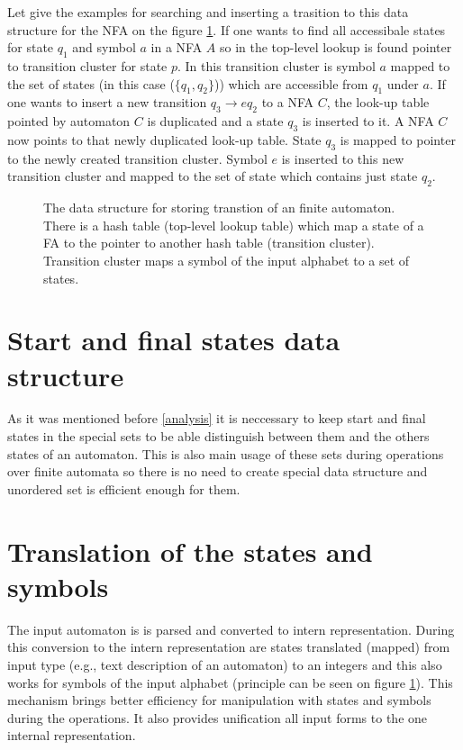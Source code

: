 Let give the examples for searching and inserting a trasition to this data structure for the NFA on the figure \ref{figExplicitFADataStr}. 
If one wants to find all accessibale states for state $q_1$ and symbol $a$ in a NFA $A$
so in the top-level lookup is found pointer to transition cluster for state $p$. In this
transition cluster is symbol $a$ mapped to the set of states (in this case ($\{q_1,q_2\}$)) which are accessible from $q_1$ under $a$.
If one wants to insert a new transition $q_3\rightarrow{e}q_2$ to a NFA $C$, the look-up table pointed by automaton $C$ is duplicated 
and a state $q_3$ is inserted to it. A NFA $C$ now points to that newly duplicated look-up table. State $q_3$ is mapped to pointer to the newly created
transition cluster. Symbol $e$ is inserted to this new transition cluster and mapped to the set of state which contains just state $q_2$.

\begin{figure}[h]
\begin{center}

		\label{figExplicitFADataStr}
    \caption{The data structure for storing transtion of an finite automaton. There is a hash table (top-level lookup table) 
      which map a state of a FA to the pointer to another hash table (transition cluster). Transition cluster maps a symbol of the input alphabet
      to a set of states.}
\end{center}
\end{figure}

\section{Start and final states data structure}
As it was mentioned before \ref{analysis} it is neccessary to keep start and final states in the special sets to be able distinguish between them and the others
states of an automaton. This is also main usage of these sets during operations over finite automata so there is no need to create special data structure and 
unordered set is efficient enough for them.

\section{Translation of the states and symbols}
\label{sectionTranslate}
The input automaton is is parsed and converted to intern representation. During this conversion to the intern representation are states translated
(mapped) from input type (e.g., text description of an automaton) 
to an integers and this also works for symbols of the input alphabet (principle can be seen on figure \ref{figExplicitFADataStr}). 
This mechanism brings better efficiency for manipulation with states and symbols
during the operations. It also provides unification all input forms to the one internal representation. 

